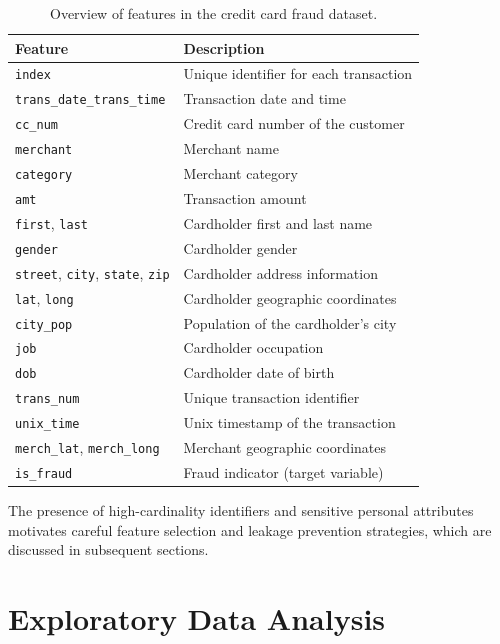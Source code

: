 \documentclass[oneside,12pt,parskip=half,american,numbers=noenddot]{scrreprt}
\begin{document}
\begin{table}[H]
\centering
\caption{Overview of features in the credit card fraud dataset.}
\label{tab:dataset_features}
\small
\renewcommand{\arraystretch}{1.2}
\begin{tabular}{ll}
\hline
\textbf{Feature} & \textbf{Description} \\
\hline
\texttt{index} & Unique identifier for each transaction \\
\texttt{trans\_date\_trans\_time} & Transaction date and time \\
\texttt{cc\_num} & Credit card number of the customer \\
\texttt{merchant} & Merchant name \\
\texttt{category} & Merchant category \\
\texttt{amt} & Transaction amount \\
\texttt{first}, \texttt{last} & Cardholder first and last name \\
\texttt{gender} & Cardholder gender \\
\texttt{street}, \texttt{city}, \texttt{state}, \texttt{zip} & Cardholder address information \\
\texttt{lat}, \texttt{long} & Cardholder geographic coordinates \\
\texttt{city\_pop} & Population of the cardholder’s city \\
\texttt{job} & Cardholder occupation \\
\texttt{dob} & Cardholder date of birth \\
\texttt{trans\_num} & Unique transaction identifier \\
\texttt{unix\_time} & Unix timestamp of the transaction \\
\texttt{merch\_lat}, \texttt{merch\_long} & Merchant geographic coordinates \\
\texttt{is\_fraud} & Fraud indicator (target variable) \\
\hline
\end{tabular}
\end{table}

The presence of high-cardinality identifiers and sensitive personal attributes motivates careful feature selection and leakage prevention strategies, which are discussed in subsequent sections.


\section{Exploratory Data Analysis}
\label{sec:eda}
\end{document}
